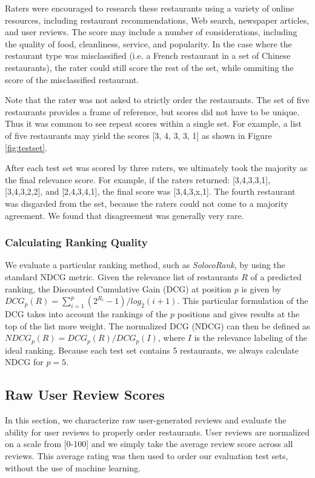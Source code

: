 \squishend
Raters were encouraged to research these restaurants using a variety of online resources, 
including restaurant recommendations, Web search, newspaper articles, and user reviews.
The score may include a number of considerations, 
including the quality of food, cleanliness, service, and popularity. 
In the case where the restaurant type was misclassified 
(i.e. a French restaurant in a set of Chinese restaurants), 
the rater could still score the rest of the set, while ommiting the score of the misclassified restaurant.

Note that the rater was not asked to strictly order the restaurants. 
The set of five restaurants provides a frame of reference, but scores did not have to be unique.
Thus it was common to see repeat scores within a single set.
For example, a list of five restaurants may yield the scores [3, 4, 3, 3, 1]
as shown in Figure \ref{fig:testset}.

After each test set was scored by three raters, we ultimately took the majority 
as the final relevance score.
For example, if the raters returned: [3,4,3,3,1], [3,4,3,2,2], and [2,4,3,4,1], 
the final score was [3,4,3,x,1].
The fourth restaurant was disgarded from the set, 
because the raters could not come to a majority agreement.
We found that disagreement was generally very rare.

\subsubsection{Calculating Ranking Quality}
We evaluate a particular ranking method, such as \emph{SolocoRank}, by using the standard NDCG metric.
Given the relevance list of restaurants $R$ of a predicted ranking, 
the Discounted Cumulative Gain (DCG)
at position $p$ is given by $DCG_p(R) = \sum_{i=1}^{p}(2^{R_i}-1)/log_2(i+1)$.
This particular formulation of the DCG takes into account the rankings of the $p$ positions
and gives results at the top of the list more weight.
The normalized DCG (NDCG) can then be defined as $NDCG_p(R) = DCG_p(R)/DCG_p(I)$, where $I$ is
the relevance labeling of the ideal ranking.
Because each test set contains 5 restaurants, we always calculate NDCG for $p=5$.

\subsection{Raw User Review Scores}
In this section, we characterize raw user-generated reviews and 
evaluate the ability for user reviews to properly order restaurants.
User reviews are normalized on a scale from [0-100] and we simply take the average
review score across all reviews.
This average rating was then used to order our evaluation test sets,
without the use of machine learning.

